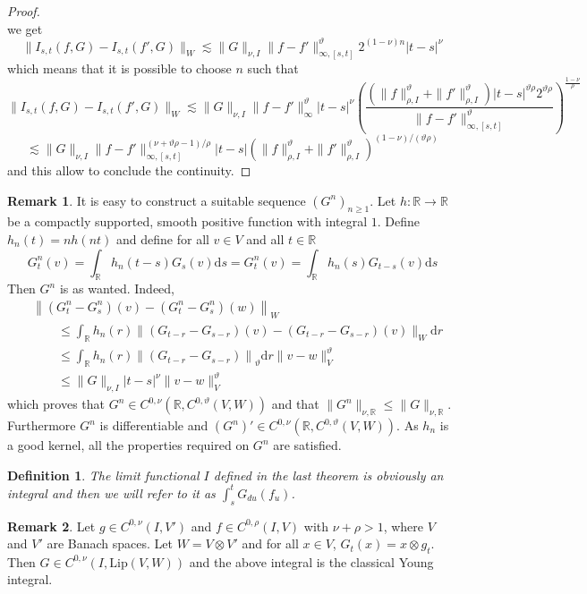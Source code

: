 \documentclass[11pt,a4paper,draft,reqno]{amsart}
\newtheorem{definition}{Definition}
\theoremstyle{definition}
\newtheorem{remark}{Remark}
\newcommand{\RR}{\mathbb{R}}
\newcommand{\dd}{\mathrm{d}}
\begin{document}
\begin{proof}
$$$$
we get
$$
\|I_{s,t}(f,G) - I_{s,t}(f',G) \|_W \lesssim \|G\|_{\nu,I} \|f-f'\|^\vartheta_{\infty,[s,t]} 2^{(1-\nu)n} |t-s|^\nu
$$
which means that it is possible to choose $n$ such that
$$
\|I_{s,t}(f,G) - I_{s,t}(f',G) \|_W
\lesssim
\|G\|_{\nu,I} \|f-f'\|^\vartheta_{\infty} |t-s|^\nu\left(\frac{(\|f\|^\vartheta_{\rho,I}+\|f'\|^\vartheta_{\rho,I})  |t-s|^{\vartheta\rho} 2^{\vartheta\rho}}{\|f-f'\|^\vartheta_{\infty,[s,t]}}\right)^{\frac{1-\nu}\rho}
$$
$$
\lesssim
\|G\|_{\nu,I} \|f-f'\|_{\infty,[s,t]}^{(\nu+\vartheta\rho-1)/\rho}  |t-s| \left(\|f\|_{\rho,I}^\vartheta+\|f'\|^\vartheta_{\rho,I}\right)^{(1-\nu)/(\vartheta\rho)}
$$
and this allow to conclude the continuity.
\end{proof}
\begin{remark}
It is easy to construct a suitable sequence $(G^n)_{n\ge 1}$. Let $h:\RR\to\RR$ be a compactly supported, smooth positive function with integral $1$. Define $h_n(t)=nh(nt)$ and define for all $v\in V$ and all $t\in\RR$
$$G_t^n(v) = \int_\RR h_n(t-s)G_s(v)\dd s = G_t^n(v) = \int_\RR h_n(s)G_{t-s}(v)\dd s$$
Then $G^n$ is as wanted. Indeed,
\begin{equation*}
\begin{split}
& \left\|\left(G_t^n-G_s^n\right)(v)-\left(G_t^n-G_s^n\right)(w)\right\|_W
\\ &\qquad 
\le
\int_\RR h_n( r) \big\|\left(G_{t-r}-G_{s-r}\right)(v)
-\left(G_{t-r}-G_{s-r}\right)(v)\big\|_W\dd r
\\ &\qquad\le
\int_\RR h_n( r) \left\|\left(G_{t-r}-G_{s-r}\right)\right\|_{\vartheta}\dd r \|v-w\|^\vartheta_V
\\&\qquad\le
\|G\|_{\nu,I}|t-s|^\nu\|v-w\|^\vartheta_V
\end{split}
\end{equation*}
which proves that $G^n\in C^{0,\nu}(\RR, C^{0,\vartheta}(V,W))$ and that $\|G^n\|_{\nu,\RR}\le\|G\|_{\nu,\RR}$. Furthermore $G^n$ is differentiable and
$(G^n)' \in C^{0,\nu}(\RR, C^{0,\vartheta}(V,W))$. As $h_n$ is a good kernel, all the properties required on $G^n$ are satisfied.
\end{remark}
\begin{definition}
The limit functional $I$ defined in the last theorem is obviously an integral and then we will refer to it as
$\int_{s}^t G_{du}(f_u) $.
\end{definition}
%
\begin{remark}
Let $g\in C^{0,\nu}(I,V')$ and $f\in C^{0,\rho}(I,V)$ with $\nu+\rho>1$, where $V$ and $V'$ are Banach spaces. Let $W=V\otimes V'$ and for all $x\in V$,
$
G_t(x)=x \otimes g_t 
$.
Then $G\in C^{0,\nu}(I, \mathrm{Lip}(V,W))$ and the above integral is the classical Young integral.
\end{remark}
\end{document}
